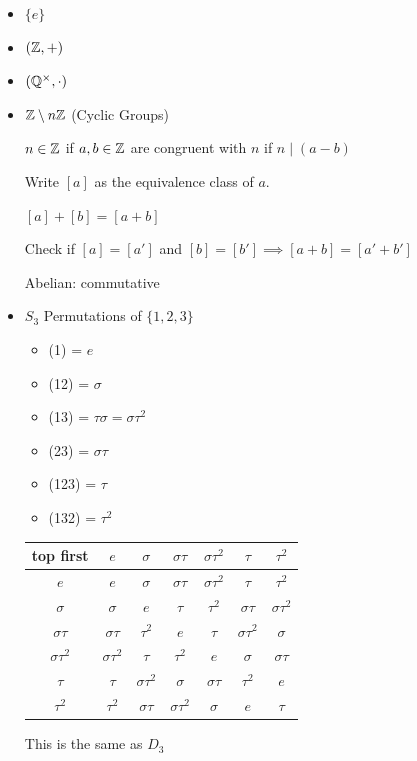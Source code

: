 \begin{example}
    \begin{itemize}
        \item $\{e\}$
        \item $\left( \mathbb{Z}, + \right)$
        \item $\left( \mathbb{Q}^{\times}, \cdot \right)$
        \item $\mathbb{Z} \setminus n\mathbb{Z}$ (Cyclic Groups)
        
        $n \in \mathbb{Z}$ if $a,b \in \mathbb{Z}$ are congruent with $n$ if $n \mid (a-b)$

        \begin{definition}
            Write $[a]$ as the equivalence class of $a$.
            
            $[a]+[b]=[a+b]$
        \end{definition}
        Check if $[a]=[a']$ and $[b]=[b'] \implies [a+b]=[a'+b']$

        Abelian: commutative

        \item $S_3$ Permutations of $\{1,2,3\}$
        
        \begin{itemize}
            \item (1) = $e$
            \item (12) = $\sigma$
            \item (13) = $\tau\sigma=\sigma\tau^2$
            \item (23) = $\sigma\tau$
            \item (123) = $\tau$
            \item (132) = $\tau^2$
        \end{itemize}
        \begin{center}
            \begin{tabular}{ c|cccccc } 
            top first& $e$ & $\sigma$ & $\sigma\tau$ & $\sigma\tau^2$ & $\tau$ & $\tau^2$ \\
             \hline 
             $e$ & $e$ & $\sigma$ & $\sigma\tau$ & $\sigma\tau^2$ & $\tau$ & $\tau^2$ \\ 
             $\sigma$ & $\sigma$ & $e$ & $\tau$ & $\tau^2$ & $\sigma\tau$ & $\sigma\tau^2$ \\
             $\sigma\tau$ & $\sigma\tau$ & $\tau^2$ & $e$ & $\tau$ & $\sigma\tau^2$ & $\sigma$ \\
             $\sigma\tau^2$ & $\sigma\tau^2$ & $\tau$ & $\tau^2$ & $e$ & $\sigma$ & $\sigma\tau$ \\
             $\tau$ & $\tau$ & $\sigma\tau^2$ & $\sigma$ & $\sigma\tau$ & $\tau^2$ & $e$ \\
             $\tau^2$ & $\tau^2$ & $\sigma\tau$ & $\sigma\tau^2$ & $\sigma$ & $e$ & $\tau$
            \end{tabular}
            \end{center}
        This is the same as $D_3$


\end{itemize}
\end{example}
